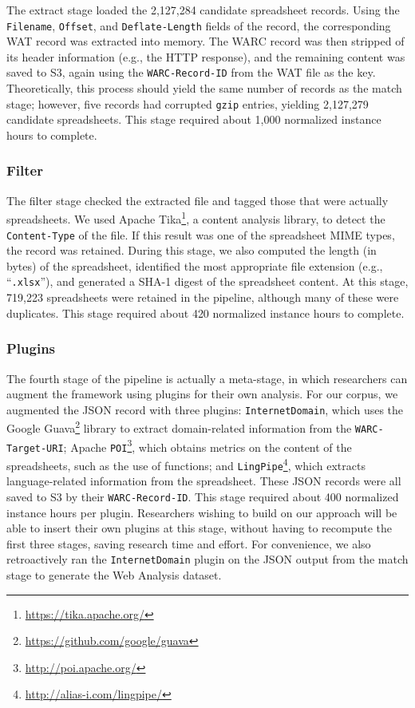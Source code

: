 \documentclass{svjour3}
\begin{document}
The extract stage loaded the 2,127,284 candidate spreadsheet records. Using the \texttt{Filename}, \texttt{Offset}, and \texttt{Deflate-Length} fields of the record, the corresponding WAT record was extracted into memory. The WARC record was then stripped of its header information (e.g., the HTTP response), and the remaining content was saved to S3, again using the \texttt{WARC-Record-ID} from the WAT file as the key. Theoretically, this process should yield the same number of records as the match stage; however, five records had corrupted \texttt{gzip} entries, yielding 2,127,279 candidate spreadsheets. This stage required about 1,000 normalized instance hours to complete.

\subsubsection{Filter}

The filter stage checked the extracted file and tagged those that were actually spreadsheets. We used Apache Tika\footnote{\url{https://tika.apache.org/}}, a content analysis library, to detect the \texttt{Content-Type} of the file. If this result was one of the spreadsheet MIME types, the record was retained. During this stage, we also computed the length (in bytes) of the spreadsheet, identified the most appropriate file extension (e.g., ``\texttt{.xlsx}''), and generated a SHA-1 digest of the spreadsheet content.  At this stage, 719,223 spreadsheets were retained in the pipeline, although many of these were duplicates. This stage required about 420 normalized instance hours to complete.

\subsubsection{Plugins} 

The fourth stage of the pipeline is actually a meta-stage, in which researchers can augment the framework using plugins for their own analysis. For our corpus, we augmented the JSON record with three plugins: \texttt{InternetDomain}, which uses the Google Guava\footnote{\url{https://github.com/google/guava}} library to extract domain-related information from the \texttt{WARC-Target-URI}; Apache \texttt{POI}\footnote{\url{http://poi.apache.org/}}, which obtains metrics on the content of the spreadsheets, such as the use of functions; and \texttt{LingPipe}\footnote{\url{http://alias-i.com/lingpipe/}}, which extracts language-related information from the spreadsheet. These JSON records were all saved to S3 by their \texttt{WARC-Record-ID}. This stage required about 400 normalized instance hours per plugin. Researchers wishing to build on our approach will be able to insert their own plugins at this stage, without having to recompute the first three stages, saving research time and effort. For convenience, we also retroactively ran the \texttt{InternetDomain} plugin on the JSON output from the match stage to generate the Web Analysis dataset.
\end{document}

